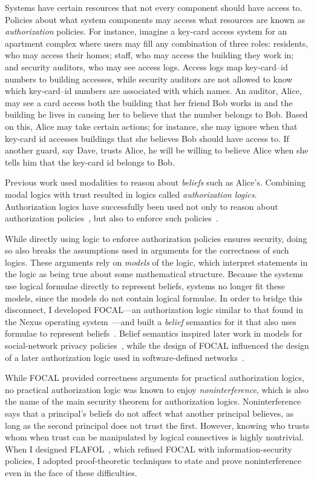 \documentclass{article}
\theoremstyle{definition}
\begin{document}
Systems have certain resources that not every component should have access to.
Policies about what system components may access what resources are known as \emph{authorization} policies.
For instance, imagine a key-card access system for an apartment complex where users may fill any combination of three roles: residents, who may access their homes; staff, who may access the building they work in; and security auditors, who may see access logs.
Access logs map key-card--id numbers to building accesses, while security auditors are not allowed to know which key-card--id numbers are associated with which names.
An auditor, Alice, may see a card access both the building that her friend Bob works in and the building he lives in causing her to believe that the number belongs to Bob.
Based on this, Alice may take certain actions; for instance, she may ignore when that key-card id accesses buildings that she believes Bob should have access to.
If another guard, say Dave, trusts Alice, he will be willing to believe Alice when she tells him that the key-card id belongs to Bob.

Previous work used modalities to reason about \emph{beliefs} such as Alice's.
Combining modal logics with trust resulted in logics called \emph{authorization logics}.
Authorization logics have successfully been used not only to reason about authorization policies~\citep{Abadi06}, but also to enforce such policies~\cite{SchneiderWS11,SirerDBRSWWS11}.

While directly using logic to enforce authorization policies ensures security, doing so also breaks the assumptions used in arguments for the correctness of such logics.
These arguments rely on \emph{models} of the logic, which interpret statements in the logic as being true about some mathematical structure.
Because the systems use logical formulae directly to represent beliefs, systems no longer fit these models, since the models do not contain logical formulae.
In order to bridge this disconnect, I developed FOCAL---an authorization logic similar to that found in the Nexus operating system~\citep{SchneiderWS11,SirerDBRSWWS11}---and built a \emph{belief} semantics for it that also uses formulae to represent beliefs~\citep{HirschC13}.
Belief semantics inspired later work in models for social-network privacy policies~\cite{PardoS17}, while the design of FOCAL influenced the design of a later authorization logic used in software-defined networks~\citep{SkalkaRDKGDSF19}.

While FOCAL provided correctness arguments for practical authorization logics, no practical authorization logic was known to enjoy \emph{noninterference}, which is also the name of the main security theorem for authorization logics.
Noninterference says that a principal's beliefs do not affect what another principal believes, as long as the second principal does not trust the first.
However, knowing who trusts whom when trust can be manipulated by logical connectives is highly nontrivial.
When I designed FLAFOL~\citep{HirschACAT20}, which refined FOCAL with information-security policies, I adopted proof-theoretic techniques to state and prove noninterference even in the face of these difficulties.
\end{document}
